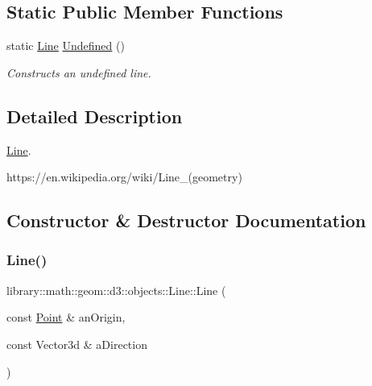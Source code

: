 \subsection*{Static Public Member Functions}
\begin{DoxyCompactItemize}
\item 
static \hyperlink{classlibrary_1_1math_1_1geom_1_1d3_1_1objects_1_1_line}{Line} \hyperlink{classlibrary_1_1math_1_1geom_1_1d3_1_1objects_1_1_line_a6e80b434196ee84bc74154532989c18c}{Undefined} ()
\begin{DoxyCompactList}\small\item\em Constructs an undefined line. \end{DoxyCompactList}\end{DoxyCompactItemize}


\subsection{Detailed Description}
\hyperlink{classlibrary_1_1math_1_1geom_1_1d3_1_1objects_1_1_line}{Line}. 

https\+://en.wikipedia.\+org/wiki/\+Line\+\_\+(geometry) 

\subsection{Constructor \& Destructor Documentation}
\mbox{\label{classlibrary_1_1math_1_1geom_1_1d3_1_1objects_1_1_line_a762e529453ff9ffa9233fd73737f4692}} 
\subsubsection{\texorpdfstring{Line()}{Line()}}
{\footnotesize\ttfamily library\+::math\+::geom\+::d3\+::objects\+::\+Line\+::\+Line (\begin{DoxyParamCaption}\item[{const \hyperlink{classlibrary_1_1math_1_1geom_1_1d3_1_1objects_1_1_point}{Point} \&}]{an\+Origin,  }\item[{const Vector3d \&}]{a\+Direction }\end{DoxyParamCaption})}



